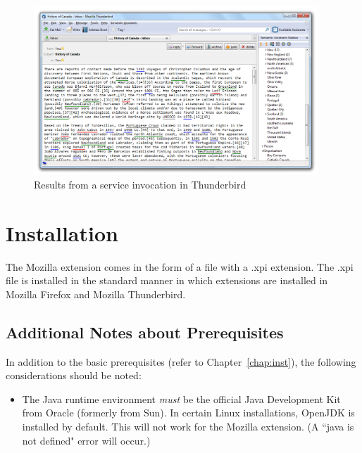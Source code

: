 \begin{figure}[htb]
  \centering
  \includegraphics[width=0.95\textwidth]{pictures/mozilla_features_thunderbird_window_message_tab.png}
  \caption{Results from a service invocation in Thunderbird}
  \label{fig:mozilla_features_thunderbird_window_message_tab}
\end{figure}

\section{Installation}
\label{subsec:mozilla_installation}
The Mozilla extension comes in the form of a file with a .xpi extension. The .xpi file is installed in the standard manner in which extensions are installed in Mozilla Firefox and Mozilla Thunderbird. 

\subsection{Additional Notes about Prerequisites}
In addition to the basic prerequisites (refer to Chapter~\ref{chap:inst}), the following considerations should be noted: 
\begin{itemize}
  \item The Java runtime environment \emph{must} be the official Java Development Kit from Oracle (formerly from Sun). In certain Linux installations, OpenJDK is installed by default. This will not work for the Mozilla extension. (A ``java is not defined" error will occur.)
\end{itemize}

